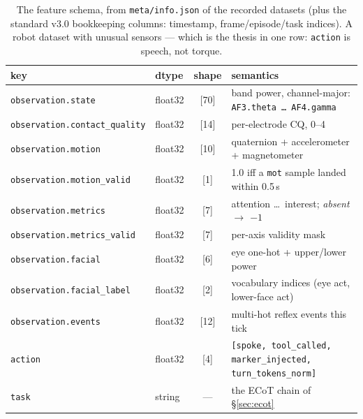 \documentclass{article}
\begin{document}
\begin{table}[h]
\centering
\small
\begin{tabular}{@{}llcl@{}}
\toprule
\textbf{key} & \textbf{dtype} & \textbf{shape} & \textbf{semantics} \\
\midrule
\texttt{observation.state} & float32 & [70] & band power, channel-major: \texttt{AF3.theta \ldots\ AF4.gamma} \\
\texttt{observation.contact\_quality} & float32 & [14] & per-electrode CQ, 0--4 \\
\texttt{observation.motion} & float32 & [10] & quaternion + accelerometer + magnetometer \\
\texttt{observation.motion\_valid} & float32 & [1] & 1.0 iff a \texttt{mot} sample landed within 0.5\,s \\
\texttt{observation.metrics} & float32 & [7] & attention \ldots\ interest; \emph{absent $\to$ $-1$} \\
\texttt{observation.metrics\_valid} & float32 & [7] & per-axis validity mask \\
\texttt{observation.facial} & float32 & [6] & eye one-hot + upper/lower power \\
\texttt{observation.facial\_label} & float32 & [2] & vocabulary indices (eye act, lower-face act) \\
\texttt{observation.events} & float32 & [12] & multi-hot reflex events this tick \\
\texttt{action} & float32 & [4] & \texttt{[spoke, tool\_called, marker\_injected, turn\_tokens\_norm]} \\
\texttt{task} & string & --- & the ECoT chain of \S\ref{sec:ecot} \\
\bottomrule
\end{tabular}
\caption{The feature schema, from \texttt{meta/info.json} of the recorded datasets (plus the standard v3.0 bookkeeping columns: timestamp, frame/episode/task indices). A robot dataset with unusual sensors --- which is the thesis in one row: \texttt{action} is speech, not torque.}
\label{tab:schema}
\end{table}
\end{document}
